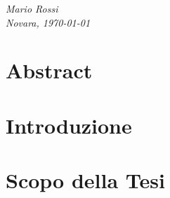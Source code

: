 \documentclass[
    italian,          %
    12pt,
    a4paper,
    twoside,
]{book}
\newcommand{\AuthorName}{Mario Rossi}
\newcommand{\City}{Novara}
\begin{document}
\stopThumbs

\frontmatter


\begin{titlepage}
    
\end{titlepage}

\thispagestyle{empty}
\vspace*{\fill}
\begin{center}                                          %
    {\small \it
        \AuthorName\\

        \City, \monthyeardate\today                     %
    }
\end{center}

\chapter*{\centering Abstract}
\thispagestyle{plain}


\tableofcontents
\thispagestyle{plain}

\mainmatter
{}


\chapter{Introduzione}                   %
\startThumbs                             %
\stopThumbs                              %

\chapter{Scopo della Tesi}
\startThumbs

\stopThumbs
\end{document}
